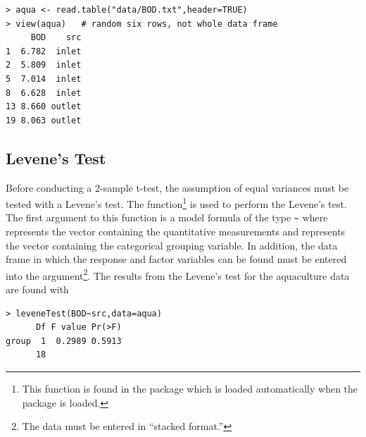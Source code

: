 \documentclass[10pt,openany]{book}\usepackage[]{graphicx}\usepackage[]{color}
\makeatletter
\newenvironment{kframe}{%
 \def\at@end@of@kframe{}%
 \ifinner\ifhmode%
  \def\at@end@of@kframe{\end{minipage}}%
  \begin{minipage}{\columnwidth}%
 \fi\fi%
 \def\FrameCommand##1{\hskip\@totalleftmargin \hskip-\fboxsep
 \colorbox{shadecolor}{##1}\hskip-\fboxsep
     \hskip-\linewidth \hskip-\@totalleftmargin \hskip\columnwidth}%
 \MakeFramed {\advance\hsize-\width
   \@totalleftmargin\z@ \linewidth\hsize
   \@setminipage}}%
 {\par\unskip\endMakeFramed%
 \at@end@of@kframe}
\newenvironment{knitrout}{}{} %
\makeatother
\begin{document}
\begin{knitrout}
\color{fgcolor}\begin{kframe}
\begin{verbatim}
> aqua <- read.table("data/BOD.txt",header=TRUE)
> view(aqua)   # random six rows, not whole data frame
     BOD    src
1  6.782  inlet
2  5.809  inlet
5  7.014  inlet
8  6.628  inlet
13 8.660 outlet
19 8.063 outlet
\end{verbatim}
\end{kframe}
\end{knitrout}


\vspace{-12pt}

\subsection{Levene's Test}
Before conducting a 2-sample t-test, the assumption of equal variances must be tested with a Levene's test.  The  function\footnote{This function is found in the  package which is loaded automatically when the  package is loaded.} is used to perform the Levene's test.  The first argument to this function is a model formula of the type \verb"~" where  represents the vector containing the quantitative measurements and  represents the vector containing the categorical grouping variable.  In addition, the data frame in which the response and factor variables can be found must be entered into the  argument\footnote{The data must be entered in ``stacked format.''}.  The results from the Levene's test for the aquaculture data are found with

\begin{knitrout}
\color{fgcolor}\begin{kframe}
\begin{verbatim}
> leveneTest(BOD~src,data=aqua)
      Df F value Pr(>F)
group  1  0.2989 0.5913
      18               
\end{verbatim}
\end{kframe}
\end{knitrout}
\end{document}

